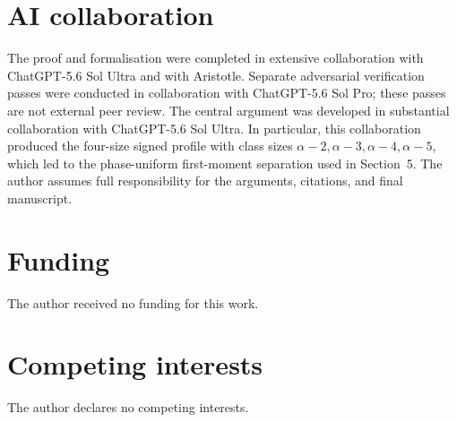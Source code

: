 \documentclass[11pt,reqno]{amsart}
\begin{document}
\section*{AI collaboration}

The proof and formalisation were completed in extensive collaboration with
ChatGPT-5.6 Sol Ultra and with Aristotle. Separate adversarial verification
passes were conducted in collaboration with ChatGPT-5.6 Sol Pro; these passes
are not external peer review. The central argument was developed in substantial
collaboration with ChatGPT-5.6 Sol Ultra. In particular, this collaboration
produced the four-size signed profile with class sizes
\(\alpha-2,\alpha-3,\alpha-4,\alpha-5\), which led to the phase-uniform
first-moment separation used in Section~5. The author assumes full
responsibility for the arguments, citations, and final manuscript.

\section*{Funding}

The author received no funding for this work.

\section*{Competing interests}

The author declares no competing interests.

\renewcommand{\bibsection}{\section*{References}}


\end{document}
